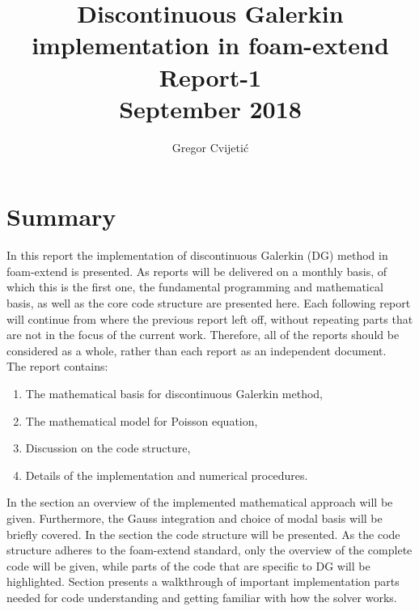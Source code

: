 \documentclass[11pt, a4paper]{article}
\title{\vspace{4cm}%
\Huge
\bf Discontinuous Galerkin implementation in foam-extend\\[2cm]
\huge
Report-1\\
September 2018\\[1cm]
}
\author[]{Gregor Cvijeti\'{c}}
\affil[]{ \small University of Zagreb, Croatia, gregor.cvijetic@fsb.hr}
\date{\vspace{-5ex}}
\begin{document}
\maketitle
\thispagestyle{empty}

\pagebreak

\tableofcontents



\section*{Summary}
\label{sec:1}

\noindent In this report the implementation of discontinuous Galerkin (DG)
method in
foam-extend is presented. As reports will be delivered on a monthly basis, of
which this is the first one, the fundamental programming and mathematical basis,
as well as the core code structure are presented here. Each following report
will continue from where the previous report left off, without repeating parts
that are not in the focus of the current work. Therefore, all of the reports
should be considered as a whole, rather than each report as an independent
document.\\

\noindent The report contains:
\begin{enumerate}
    \item The mathematical basis for discontinuous Galerkin method,
    \item The mathematical model for Poisson equation,
    \item Discussion on the code structure,
    \item Details of the implementation and numerical procedures.
\end{enumerate}

\vspace{12pt}

\noindent In the section  an overview of the implemented
mathematical approach will be given. Furthermore, the Gauss integration and
choice of modal basis will be briefly covered. In the section 
the code structure will be presented. As the code structure adheres to the
foam-extend standard, only the overview of the complete code will be given,
while parts of the code that are specific to DG will be highlighted.  Section
 presents a walkthrough of important implementation parts
needed for code understanding and getting familiar with how the solver
works.


\end{document}
